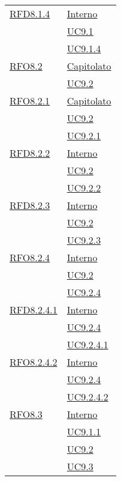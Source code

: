 \begin{longtable}{|>{\centering}m{5cm}|m{5cm}<{\centering}|}
\hyperlink{RFD8.1.4}{RFD8.1.4} & \hyperlink{Interno}{Interno}\\
& \hyperref[UC9.1]{UC9.1}\\
& \hyperref[UC9.1.4]{UC9.1.4}\\ \hline

\hyperlink{RFO8.2}{RFO8.2} & \hyperlink{Capitolato}{Capitolato}\\
& \hyperref[UC9.2]{UC9.2}\\ \hline

\hyperlink{RFO8.2.1}{RFO8.2.1} & \hyperlink{Capitolato}{Capitolato}\\
& \hyperref[UC9.2]{UC9.2}\\
& \hyperref[UC9.2.1]{UC9.2.1}\\ \hline

\hyperlink{RFD8.2.2}{RFD8.2.2} & \hyperlink{Interno}{Interno}\\
& \hyperref[UC9.2]{UC9.2}\\
& \hyperref[UC9.2.2]{UC9.2.2}\\ \hline

\hyperlink{RFD8.2.3}{RFD8.2.3} & \hyperlink{Interno}{Interno}\\
& \hyperref[UC9.2]{UC9.2}\\
& \hyperref[UC9.2.3]{UC9.2.3}\\ \hline

\hyperlink{RFO8.2.4}{RFO8.2.4} & \hyperlink{Interno}{Interno}\\
& \hyperref[UC9.2]{UC9.2}\\
& \hyperref[UC9.2.4]{UC9.2.4}\\ \hline

\hyperlink{RFD8.2.4.1}{RFD8.2.4.1} & \hyperlink{Interno}{Interno}\\
& \hyperref[UC9.2.4]{UC9.2.4}\\
& \hyperref[UC9.2.4.1]{UC9.2.4.1}\\ \hline

\hyperlink{RFO8.2.4.2}{RFO8.2.4.2} & \hyperlink{Interno}{Interno}\\
& \hyperref[UC9.2.4]{UC9.2.4}\\
& \hyperref[UC9.2.4.2]{UC9.2.4.2}\\ \hline

\hyperlink{RFO8.3}{RFO8.3} & \hyperlink{Interno}{Interno}\\
& \hyperref[UC9.1.1]{UC9.1.1}\\
& \hyperref[UC9.2]{UC9.2}\\
& \hyperref[UC9.3]{UC9.3}\\ \hline


\end{longtable}
